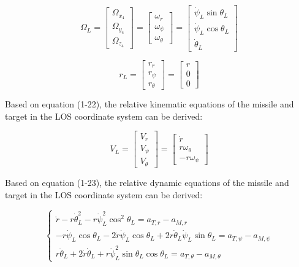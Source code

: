 \documentclass{article}
\begin{document}
\[
\Omega_L = 
\begin{bmatrix}
\Omega_{x_4} \\
\Omega_{y_4} \\
\Omega_{z_4}
\end{bmatrix}
=
\begin{bmatrix}
\omega_r \\
\omega_\psi \\
\omega_\theta
\end{bmatrix}
=
\begin{bmatrix}
\dot{\psi}_L \sin \theta_L \\
\dot{\psi}_L \cos \theta_L \\
\dot{\theta}_L
\end{bmatrix}
\tag{1-24}
\]

\[
r_L =
\begin{bmatrix}
r_r \\
r_\psi \\
r_\theta
\end{bmatrix}
=
\begin{bmatrix}
r \\
0 \\
0
\end{bmatrix}
\tag{1-25}
\]

Based on equation (1-22), the relative kinematic equations of the missile and target in the LOS coordinate system can be derived:

\[
V_L =
\begin{bmatrix}
V_r \\
V_\psi \\
V_\theta
\end{bmatrix}
=
\begin{bmatrix}
\dot{r} \\
r \omega_\theta \\
-r \omega_\psi
\end{bmatrix}
\tag{1-26}
\]

Based on equation (1-23), the relative dynamic equations of the missile and target in the LOS coordinate system can be derived:

\[
\begin{cases}
\ddot{r} - r \dot{\theta}_L^2 - r \dot{\psi}_L^2 \cos^2 \theta_L = a_{T,r} - a_{M,r} \\
-r \dot{\psi}_L \cos \theta_L - 2 \dot{r} \dot{\psi}_L \cos \theta_L + 2 r \dot{\theta}_L \dot{\psi}_L \sin \theta_L = a_{T,\psi} - a_{M,\psi} \\
r \ddot{\theta}_L + 2 \dot{r} \dot{\theta}_L + r \dot{\psi}_L^2 \sin \theta_L \cos \theta_L = a_{T,\theta} - a_{M,\theta}
\end{cases}
\tag{1-27}
\]
\end{document}
